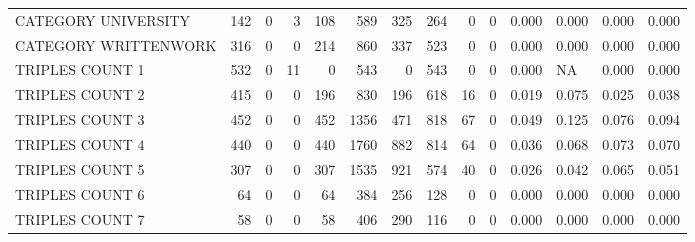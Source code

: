 \begin{tabular}{lrrrrrrrrrllll}
 CATEGORY UNIVERSITY      &             142 &             0 &               3 &             108 &             589 &  325 &  264 &    0 &    0 & 0.000 & 0.000 & 0.000 & 0.000 \\
 CATEGORY WRITTENWORK     &             316 &             0 &               0 &             214 &             860 &  337 &  523 &    0 &    0 & 0.000 & 0.000 & 0.000 & 0.000 \\
 TRIPLES COUNT 1          &             532 &             0 &              11 &               0 &             543 &    0 &  543 &    0 &    0 & 0.000 & NA    & 0.000 & 0.000 \\
 TRIPLES COUNT 2          &             415 &             0 &               0 &             196 &             830 &  196 &  618 &   16 &    0 & 0.019 & 0.075 & 0.025 & 0.038 \\
 TRIPLES COUNT 3          &             452 &             0 &               0 &             452 &            1356 &  471 &  818 &   67 &    0 & 0.049 & 0.125 & 0.076 & 0.094 \\
 TRIPLES COUNT 4          &             440 &             0 &               0 &             440 &            1760 &  882 &  814 &   64 &    0 & 0.036 & 0.068 & 0.073 & 0.070 \\
 TRIPLES COUNT 5          &             307 &             0 &               0 &             307 &            1535 &  921 &  574 &   40 &    0 & 0.026 & 0.042 & 0.065 & 0.051 \\
 TRIPLES COUNT 6          &              64 &             0 &               0 &              64 &             384 &  256 &  128 &    0 &    0 & 0.000 & 0.000 & 0.000 & 0.000 \\
 TRIPLES COUNT 7          &              58 &             0 &               0 &              58 &             406 &  290 &  116 &    0 &    0 & 0.000 & 0.000 & 0.000 & 0.000 \\
\hline
\end{tabular}